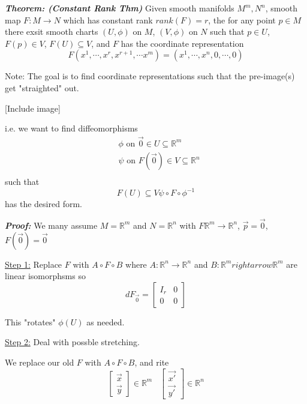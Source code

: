 \documentclass{article}
\newcommand{\R}{\mathbb{R}}
\begin{document}
\vskip 0.5cm
\begin{dottedbox}
  \emph{\textbf{Theorem: (Constant Rank Thm)}} Given smooth manifolds $M^m, N^n$, smooth map $F : M \rightarrow N$ which has constant rank $rank(F) = r$, the for any point $p \in M$ there exsit smooth charts $(U, \phi)$ on $M$, $(V, \phi)$ on $N$ such that $p \in U$, $F(p) \in V$, $F(U) \subseteq V$, and $F$ has the coordinate representation 
  \[ F(x^1, \cdots, x^r, x^{r+1}, \cdots x^m) = (x^1, \cdots, x^n, 0, \cdots, 0) \]
\end{dottedbox}

\vskip 0.5cm
\begin{dottedbox}
  Note: The goal is to find coordinate representations such that the pre-image(s) get "straighted" out.

  [Include image]

  i.e. we want to find diffeomorphisms  
  \begin{align*}
    &\phi \text{ on } \vec{0} \in U \subseteq \R^m \\
    &\psi \text{ on } F(\vec{0}) \in V \subseteq \R^n \\
  \end{align*}
  such that 
  \[ F(U) \subseteq V \psi \circ F \circ \phi^{-1} \] has the desired form.
\end{dottedbox}

\vskip 0.5cm
\emph{\textbf{Proof:}} We many assume $M = \R^m$ and $N = \R^n$ with $F \R^m \rightarrow \R^n$, $\vec{p} = \vec{0}$, $F(\vec{0}) =  \vec{0}$ 

\vskip 0.25cm
\underline{Step 1:} Replace $F$ with $A \circ F \circ B$ where $A : \R^n \rightarrow \R^n$ and $B : \R^m rightarrow \R^m$ are linear isomorphsms so 
\[ dF_{\vec{0}} = \begin{bmatrix}
  I_r & 0 \\
  0 & 0
\end{bmatrix} \]

This "rotates" $\phi(U)$ as needed.

\vskip 0.5cm

\underline{Step 2:} Deal with possble stretching.

We replace our old $F$ with $A \circ F \circ B$, and rite 
\[ \begin{bmatrix}
  \vec{x} \\
  \vec{y}
\end{bmatrix} \in \R^m\;\;\; \begin{bmatrix}
  \vec{x'} \\
  \vec{y'}
\end{bmatrix} \in \R^n \]
\end{document}
